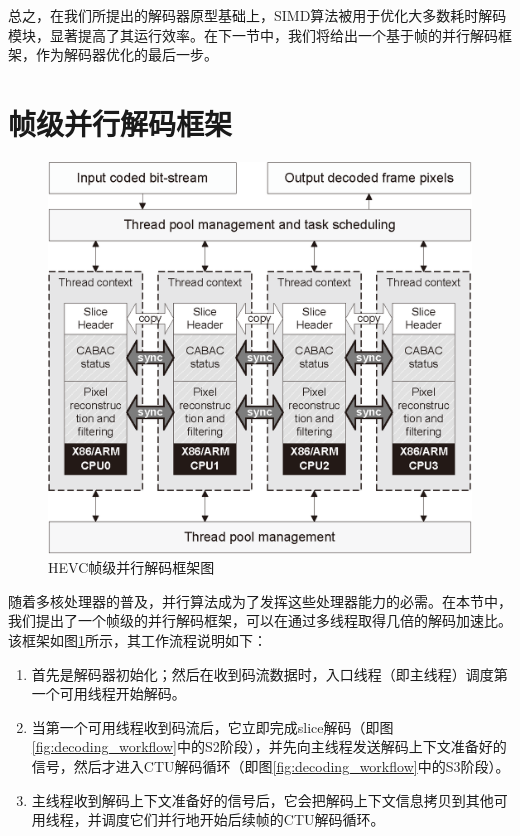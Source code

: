 总之，在我们所提出的解码器原型基础上，SIMD算法被用于优化大多数耗时解码模块，显著提高了其运行效率。在下一节中，我们将给出一个基于帧的并行解码框架，作为解码器优化的最后一步。

\section{帧级并行解码框架}

\begin{figure}[!t]
	\centering
	\includegraphics[width = 0.95\linewidth]{eps/parallel_decoding_framework}
	\caption{\label{fig:parallel_decoding_framework}HEVC帧级并行解码框架图}
\end{figure}

随着多核处理器的普及，并行算法成为了发挥这些处理器能力的必需。在本节中，我们提出了一个帧级的并行解码框架，可以在通过多线程取得几倍的解码加速比。该框架如图\ref{fig:parallel_decoding_framework}所示，其工作流程说明如下：
\begin{enumerate}
	\item 首先是解码器初始化；然后在收到码流数据时，入口线程（即主线程）调度第一个可用线程开始解码。
	\item 当第一个可用线程收到码流后，它立即完成slice解码（即图\ref{fig:decoding_workflow}中的S2阶段），并先向主线程发送解码上下文准备好的信号，然后才进入CTU解码循环（即图\ref{fig:decoding_workflow}中的S3阶段）。
	\item 主线程收到解码上下文准备好的信号后，它会把解码上下文信息拷贝到其他可用线程，并调度它们并行地开始后续帧的CTU解码循环。
\end{enumerate}

